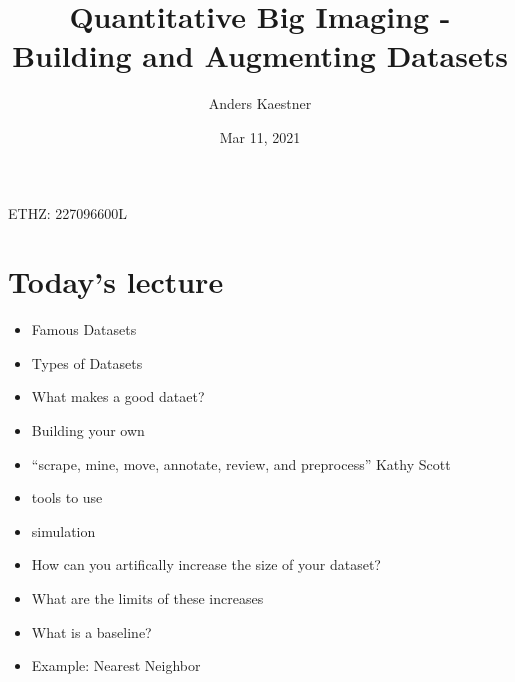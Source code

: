 \documentclass[letterpaper,10pt,english]{sphinxmanual}
\title{Quantitative Big Imaging - Building and Augmenting Datasets}
\date{Mar 11, 2021}
\author{Anders Kaestner}
\begin{document}
\pagestyle{empty}
\sphinxmaketitle
\pagestyle{plain}
\sphinxtableofcontents
\pagestyle{normal}
\label{\detokenize{03-Datasets::doc}}


\sphinxAtStartPar
{} ETHZ: 227\sphinxhyphen{}0966\sphinxhyphen{}00L




\chapter{Today’s lecture}
\label{\detokenize{03-Datasets:today-s-lecture}}
\sphinxAtStartPar
{}
\begin{itemize}
\item {} 
\sphinxAtStartPar
Famous Datasets

\item {} 
\sphinxAtStartPar
Types of Datasets

\item {} 
\sphinxAtStartPar
What makes a good dataet?

\item {} 
\sphinxAtStartPar
Building your own

\item {} 
\sphinxAtStartPar
“scrape, mine, move, annotate, review, and preprocess” \sphinxhyphen{} Kathy Scott

\item {} 
\sphinxAtStartPar
tools to use

\item {} 
\sphinxAtStartPar
simulation

\end{itemize}

\sphinxAtStartPar
{}
\begin{itemize}
\item {} 
\sphinxAtStartPar
How can you artifically increase the size of your dataset?

\item {} 
\sphinxAtStartPar
What are the limits of these increases

\end{itemize}

\sphinxAtStartPar
{}
\begin{itemize}
\item {} 
\sphinxAtStartPar
What is a baseline?

\item {} 
\sphinxAtStartPar
Example: Nearest Neighbor

\end{itemize}
\end{document}
